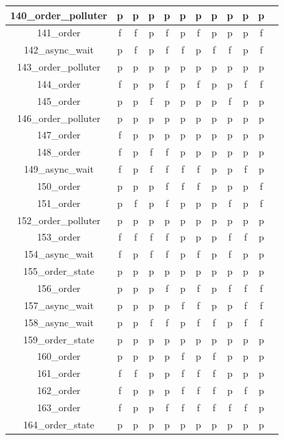 \documentclass[
fancyheadings, %
%
%
]{stsreprt}
\begin{document}
\begin{longtable}{|c|c|c|c|c|c|c|c|c|c|c|c|}
\hline
140\_order\_polluter & p & p & p & p & p & p & p & p & p & p \\
\hline
141\_order & f & f & p & f & p & f & p & p & p & f \\
\hline
142\_async\_wait & p & f & p & f & f & p & f & f & p & f \\
\hline
143\_order\_polluter & p & p & p & p & p & p & p & p & p & p \\
\hline
144\_order & f & p & p & f & p & f & p & p & f & f \\
\hline
145\_order & p & p & f & p & p & p & p & f & p & p \\
\hline
146\_order\_polluter & p & p & p & p & p & p & p & p & p & p \\
\hline
147\_order & f & p & p & p & p & p & p & p & p & p \\
\hline
148\_order & f & p & f & f & p & p & p & p & p & p \\
\hline
149\_async\_wait & f & p & f & f & f & f & p & p & f & p \\
\hline
150\_order & p & p & p & f & f & f & p & p & p & f \\
\hline
151\_order & p & f & p & f & p & p & p & f & p & f \\
\hline
152\_order\_polluter & p & p & p & p & p & p & p & p & p & p \\
\hline
153\_order & f & f & f & f & p & p & p & f & f & p \\
\hline
154\_async\_wait & f & p & f & f & p & f & p & f & p & p \\
\hline
155\_order\_state & p & p & p & p & p & p & p & p & p & p \\
\hline
156\_order & p & p & p & f & p & f & p & f & f & f \\
\hline
157\_async\_wait & p & p & p & p & f & f & p & p & f & f \\
\hline
158\_async\_wait & p & p & f & f & p & f & f & p & f & f \\
\hline
159\_order\_state & p & p & p & p & p & p & p & p & p & p \\
\hline
160\_order & p & p & p & p & f & p & f & p & p & p \\
\hline
161\_order & f & f & p & p & f & f & f & p & p & p \\
\hline
162\_order & f & p & p & p & f & f & f & p & f & p \\
\hline
163\_order & f & p & p & f & f & f & f & f & f & p \\
\hline
164\_order\_state & p & p & p & p & p & p & p & p & p & p \\

\end{longtable}
\end{document}
